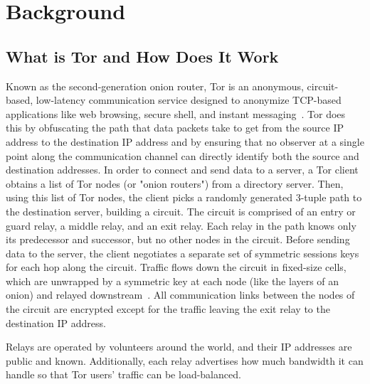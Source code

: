 \section{Background}
\label{sec:background}

\subsection{What is Tor and How Does It Work}
Known as the second-generation onion router, Tor is an anonymous, circuit-based, low-latency communication service designed to anonymize TCP-based applications like web browsing, secure shell, and instant messaging~\cite{dingledine2004tor}. Tor does this by obfuscating the path that data packets take to get from the source IP address to the destination IP address and by ensuring that no observer at a single point along the communication channel can directly identify both the source and destination addresses. In order to connect and send data to a server, a Tor client obtains a list of Tor nodes (or "onion routers") from a directory server. Then, using this list of Tor nodes, the client picks a randomly generated 3-tuple path to the destination server, building a circuit. The circuit is comprised of an entry or guard relay, a middle relay, and an exit relay. Each relay in the path knows only its predecessor and successor, but no other nodes in the circuit. Before sending data to the server, the client negotiates a separate set of symmetric sessions keys for each hop along the circuit. Traffic flows down the circuit in fixed-size cells, which are unwrapped by a symmetric key at each node (like the layers of an onion) and relayed downstream~\cite{dingledine2004tor}. All communication links between the nodes of the circuit are encrypted except for the traffic leaving the exit relay to the destination IP address. 

Relays are operated by volunteers around the world, and their IP addresses are public and known. Additionally, each relay advertises how much bandwidth it can handle so that Tor users' traffic can be load-balanced.


